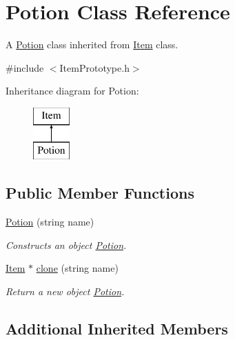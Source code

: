 \hypertarget{class_potion}{}\section{Potion Class Reference}
\label{class_potion}


A \hyperlink{class_potion}{Potion} class inherited from \hyperlink{class_item}{Item} class.  




{\ttfamily \#include $<$Item\+Prototype.\+h$>$}

Inheritance diagram for Potion\+:\begin{figure}[H]
\begin{center}
\leavevmode
\includegraphics[height=2.000000cm]{class_potion}
\end{center}
\end{figure}
\subsection*{Public Member Functions}
\begin{DoxyCompactItemize}
\item 
\hypertarget{class_potion_ae85fd98bf8c9da25af439bac1581edf4}{}\hyperlink{class_potion_ae85fd98bf8c9da25af439bac1581edf4}{Potion} (string name)\label{class_potion_ae85fd98bf8c9da25af439bac1581edf4}

\begin{DoxyCompactList}\small\item\em Constructs an object \hyperlink{class_potion}{Potion}. \end{DoxyCompactList}\item 
\hypertarget{class_potion_a79ea83f8d6cd83dcfb8bae13760684a8}{}\hyperlink{class_item}{Item} $\ast$ \hyperlink{class_potion_a79ea83f8d6cd83dcfb8bae13760684a8}{clone} (string name)\label{class_potion_a79ea83f8d6cd83dcfb8bae13760684a8}

\begin{DoxyCompactList}\small\item\em Return a new object \hyperlink{class_potion}{Potion}. \end{DoxyCompactList}\end{DoxyCompactItemize}
\subsection*{Additional Inherited Members}


